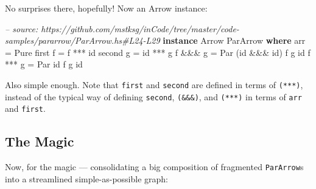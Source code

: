 \documentclass[]{article}
\newenvironment{Shaded}{}{}
\newcommand{\KeywordTok}[1]{\textcolor[rgb]{0.00,0.44,0.13}{\textbf{#1}}}
\newcommand{\DataTypeTok}[1]{\textcolor[rgb]{0.56,0.13,0.00}{#1}}
\newcommand{\CommentTok}[1]{\textcolor[rgb]{0.38,0.63,0.69}{\textit{#1}}}
\newcommand{\FunctionTok}[1]{\textcolor[rgb]{0.02,0.16,0.49}{#1}}
\newcommand{\NormalTok}[1]{#1}
\begin{document}
No surprises there, hopefully! Now an Arrow instance:

\begin{Shaded}
\begin{Highlighting}[]
\CommentTok{-- source: https://github.com/mstksg/inCode/tree/master/code-samples/pararrow/ParArrow.hs#L24-L29}
\KeywordTok{instance} \DataTypeTok{Arrow} \DataTypeTok{ParArrow} \KeywordTok{where}
\NormalTok{    arr      }\FunctionTok{=} \DataTypeTok{Pure}
\NormalTok{    first f  }\FunctionTok{=}\NormalTok{ f  }\FunctionTok{***}\NormalTok{ id}
\NormalTok{    second g }\FunctionTok{=}\NormalTok{ id }\FunctionTok{***}\NormalTok{ g}
\NormalTok{    f }\FunctionTok{&&&}\NormalTok{ g  }\FunctionTok{=} \DataTypeTok{Par}\NormalTok{ (id }\FunctionTok{&&&}\NormalTok{ id) f g id}
\NormalTok{    f }\FunctionTok{***}\NormalTok{ g  }\FunctionTok{=} \DataTypeTok{Par}\NormalTok{ id          f g id}
\end{Highlighting}
\end{Shaded}

Also simple enough. Note that \texttt{first} and \texttt{second} are defined in
terms of \texttt{(***)}, instead of the typical way of defining \texttt{second},
\texttt{(\&\&\&)}, and \texttt{(***)} in terms of \texttt{arr} and
\texttt{first}.

\subsection{The Magic}\label{the-magic}

Now, for the magic --- consolidating a big composition of fragmented
\texttt{ParArrow}s into a streamlined simple-as-possible graph:
\end{document}
